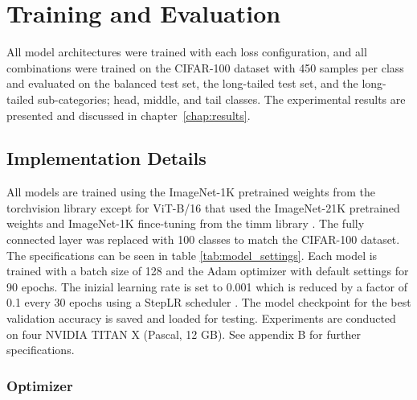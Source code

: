 
\section{Training and Evaluation}

All model architectures were trained with each loss configuration, and all combinations were trained on the CIFAR-100 dataset with 450 samples per class and evaluated on the balanced test set, the long-tailed test set, and the long-tailed sub-categories; head, middle, and tail classes. The experimental results are presented and discussed in chapter~\ref{chap:results}.

\subsection{Implementation Details}
All models are trained using the ImageNet-1K pretrained weights from the torchvision library \cite{torchvision-resnet,pytorch_mobilenetv2,torchvision2024convnextbase} except for ViT-B/16 that used the ImageNet-21K pretrained weights and ImageNet-1K fince-tuning from the timm library \cite{huggingface2024vitbase}. The fully connected layer was replaced with 100 classes to match the CIFAR-100 dataset. The specifications can be seen in table \ref{tab:model_settings}. Each model is trained with a batch size of 128 and the Adam optimizer \cite{kingma2017adammethodstochasticoptimization} with default settings for 90 epochs. The inizial learning rate is set to 0.001 which is reduced by a factor of 0.1 every 30 epochs using a StepLR scheduler \cite{pytorch_steplr}. The model checkpoint for the best validation accuracy is saved and loaded for testing. Experiments are conducted on four NVIDIA TITAN X (Pascal, 12 GB). See appendix B  for further specifications.

\subsubsection{Optimizer}

